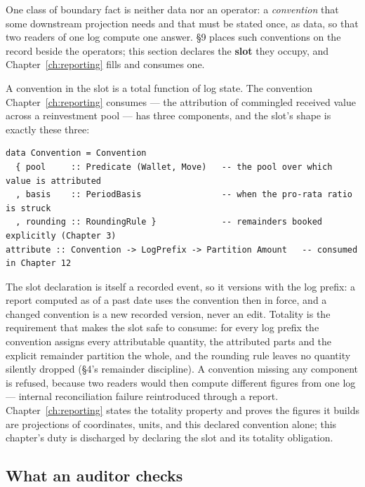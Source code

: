 One class of boundary fact is neither data nor an operator: a \emph{convention} that
some downstream projection needs and that must be stated once, as data, so that two readers
of one log compute one answer. \S 9 places such conventions on the record beside the
operators; this section declares the \textbf{slot} they occupy, and
Chapter~\ref{ch:reporting} fills and consumes one.

A convention in the slot is a total function of log state. The convention
Chapter~\ref{ch:reporting} consumes --- the attribution of commingled received value across
a reinvestment pool --- has three components, and the slot's shape is exactly these three:

\begin{lstlisting}
data Convention = Convention
  { pool     :: Predicate (Wallet, Move)   -- the pool over which value is attributed
  , basis    :: PeriodBasis                -- when the pro-rata ratio is struck
  , rounding :: RoundingRule }             -- remainders booked explicitly (Chapter 3)
attribute :: Convention -> LogPrefix -> Partition Amount   -- consumed in Chapter 12
\end{lstlisting}

The slot declaration is itself a recorded event, so it versions with the log prefix: a
report computed as of a past date uses the convention then in force, and a changed
convention is a new recorded version, never an edit. Totality is the requirement that makes
the slot safe to consume: for every log prefix the convention assigns every attributable
quantity, the attributed parts and the explicit remainder partition the whole, and the
rounding rule leaves no quantity silently dropped (\S 4's remainder discipline). A
convention missing any component is refused, because two readers would then compute
different figures from one log --- internal reconciliation failure reintroduced through a
report. Chapter~\ref{ch:reporting} states the totality property and proves the figures it
builds are projections of coordinates, units, and this declared convention alone; this
chapter's duty is discharged by declaring the slot and its totality obligation.

\subsection{What an auditor checks}

